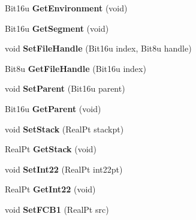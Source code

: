 \begin{DoxyCompactItemize}
\item 
\hypertarget{classDOS__PSP_abd9d560a66a8631d7fa22e8fb8fe66db}{Bit16u {\bfseries Get\-Environment} (void)}\label{classDOS__PSP_abd9d560a66a8631d7fa22e8fb8fe66db}

\item 
\hypertarget{classDOS__PSP_a9a05abd1bc11d1011d80469a410aefe2}{Bit16u {\bfseries Get\-Segment} (void)}\label{classDOS__PSP_a9a05abd1bc11d1011d80469a410aefe2}

\item 
\hypertarget{classDOS__PSP_a523f6a085c67df1128d3f9910b44c7a3}{void {\bfseries Set\-File\-Handle} (Bit16u index, Bit8u handle)}\label{classDOS__PSP_a523f6a085c67df1128d3f9910b44c7a3}

\item 
\hypertarget{classDOS__PSP_a66bb02bb96c344b216f59f0a057bdb03}{Bit8u {\bfseries Get\-File\-Handle} (Bit16u index)}\label{classDOS__PSP_a66bb02bb96c344b216f59f0a057bdb03}

\item 
\hypertarget{classDOS__PSP_a62625524bb6bf726f5aab083209336a7}{void {\bfseries Set\-Parent} (Bit16u parent)}\label{classDOS__PSP_a62625524bb6bf726f5aab083209336a7}

\item 
\hypertarget{classDOS__PSP_a37e529936a431707553c500a4f75743e}{Bit16u {\bfseries Get\-Parent} (void)}\label{classDOS__PSP_a37e529936a431707553c500a4f75743e}

\item 
\hypertarget{classDOS__PSP_a0e540bc56b998cc47d17409d0c7421d2}{void {\bfseries Set\-Stack} (Real\-Pt stackpt)}\label{classDOS__PSP_a0e540bc56b998cc47d17409d0c7421d2}

\item 
\hypertarget{classDOS__PSP_a21442c84912e132c932b6d1653a73378}{Real\-Pt {\bfseries Get\-Stack} (void)}\label{classDOS__PSP_a21442c84912e132c932b6d1653a73378}

\item 
\hypertarget{classDOS__PSP_a7336aae921571c5bf20747cb65e5ca22}{void {\bfseries Set\-Int22} (Real\-Pt int22pt)}\label{classDOS__PSP_a7336aae921571c5bf20747cb65e5ca22}

\item 
\hypertarget{classDOS__PSP_abbe00271da6ed42b385488e0dab068d8}{Real\-Pt {\bfseries Get\-Int22} (void)}\label{classDOS__PSP_abbe00271da6ed42b385488e0dab068d8}

\item 
\hypertarget{classDOS__PSP_a9cfecf70247f249b594ac90622094820}{void {\bfseries Set\-F\-C\-B1} (Real\-Pt src)}\label{classDOS__PSP_a9cfecf70247f249b594ac90622094820}


\end{DoxyCompactItemize}
